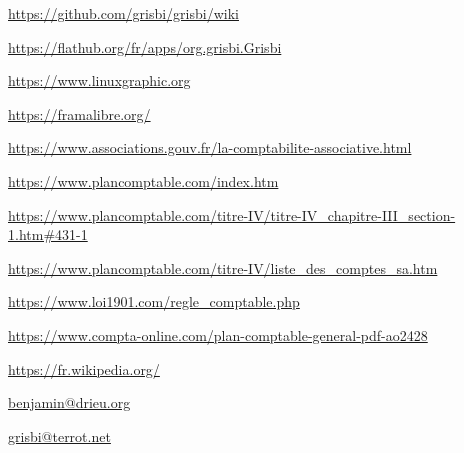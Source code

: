 \urldef{\urlGitHubGrisbiWiki}
\url{https://github.com/grisbi/grisbi/wiki}

\urldef{\urlFlatpakGrisbi}%
\url{https://flathub.org/fr/apps/org.grisbi.Grisbi}

\urldef{\urlLinuxGraphic}%
\url{https://www.linuxgraphic.org}

\urldef{\urlFramasoftLogiciels}%
\url{https://framalibre.org/}

\urldef{\urlAssociationsGouv}%
\url{https://www.associations.gouv.fr/la-comptabilite-associative.html}

\urldef{\urlPlanComptable}%
\url{https://www.plancomptable.com/index.htm}

\urldef{\urlPlanDeComptes}%
\url{https://www.plancomptable.com/titre-IV/titre-IV_chapitre-III_section-1.htm#431-1}

\urldef{\urlListeComptes}%
\url{https://www.plancomptable.com/titre-IV/liste_des_comptes_sa.htm}

\urldef{\urlMaisonAssociations}%
\url{https://www.loi1901.com/regle_comptable.php}

\urldef{\urlComptaOnLine}%
\url{https://www.compta-online.com/plan-comptable-general-pdf-ao2428}

\urldef{\urlWikipedia}%
\url{https://fr.wikipedia.org/}






\urldef{\urlBenjaminDrieuEmail}%
\url{benjamin@drieu.org}     %



\urldef{\urlFrancoisTerrotEmail}%
\url{grisbi@terrot.net}     %

